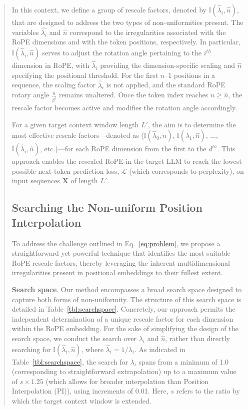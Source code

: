 \begin{abstract}
In this context, we define a group of rescale factors, denoted by $\mathbb{I}(\hat{\lambda}_{i},\hat{n})$, that are designed to address the two types of non-uniformities present. The variables $\hat{\lambda_i}$ and $\hat{n}$ correspond to the irregularities associated with the RoPE dimensions and with the token positions, respectively. In particular, $\mathbb{I}(\hat{\lambda}_{i},\hat{n})$ serves to adjust the rotation angle pertaining to the $i^{th}$ dimension in RoPE, with $\hat\lambda_{i}$ providing the dimension-specific scaling and $\hat{n}$ specifying the positional threshold. For the first $\hat{n}$–1 positions in a sequence, the scaling factor $\hat\lambda_{i}$ is not applied, and the standard RoPE rotary angle $\frac{n}{\beta^i}$ remains unaltered. Once the token index reaches $n \geq \hat{n}$, the rescale factor becomes active and modifies the rotation angle accordingly.

For a given target context window length $L'$, the aim is to determine the most effective rescale factors—denoted as ($\mathbb{I}(\hat{\lambda}_{0},\hat{n})$, $\mathbb{I}(\hat{\lambda}_{1},\hat{n})$, ..., $\mathbb{I}(\hat{\lambda}_{i},\hat{n})$, etc.)—for each RoPE dimension from the first to the $d^{th}$. This approach enables the rescaled $\text{RoPE}$ in the target $\text{LLM}$ to reach the lowest possible next-token prediction loss, $\mathcal{L}$ (which corresponds to perplexity), on input sequences $\mathbf{X}$ of length $L'$.

\subsection{Searching the Non-uniform Position Interpolation}

To address the challenge outlined in Eq.~\ref{eq:problem}, we propose a straightforward yet powerful technique that identifies the most suitable RoPE rescale factors, thereby leveraging the inherent multidimensional irregularities present in positional embeddings to their fullest extent.

\textbf{Search space}. Our method encompasses a broad search space designed to capture both forms of non-uniformity. The structure of this search space is detailed in Table~\ref{tbl:searchspace}. Concretely, our approach permits the independent determination of a unique rescale factor for each dimension within the RoPE embedding. For the sake of simplifying the design of the search space, we conduct the search over $\lambda_i$ and $\hat{n}$, rather than directly searching for $\mathbb{I}(\hat{\lambda}_{i},\hat{n})$, where $\hat{\lambda}_{i}=1/\lambda_i$. As indicated in Table~\ref{tbl:searchspace}, the search for $\lambda_i$ spans from a minimum of 1.0 (corresponding to straightforward extrapolation) up to a maximum value of $s\times1.25$ (which allows for broader interpolation than Position Interpolation (PI)), using increments of 0.01. Here, $s$ refers to the ratio by which the target context window is extended.


\end{abstract}
